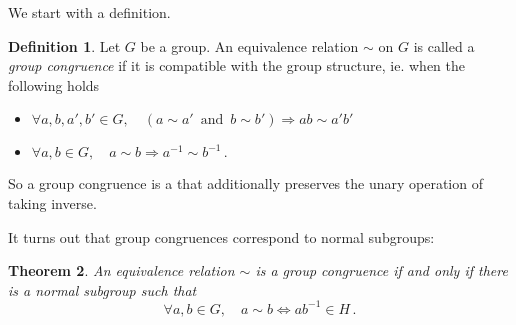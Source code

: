 \documentclass[12pt]{article}
\newtheorem{thm}{Theorem}
\theoremstyle{definition}
\newtheorem{defn}[thm]{Definition}
\theoremstyle{remark}
\numberwithin{equation}{subsection}
\begin{document}
We start with a definition.  

\begin{defn}
  Let $G$ be a group.  An equivalence relation $\sim$ on $G$ is
  called a \emph{group congruence} if it is compatible with the 
  group structure, ie. when the following holds
  \begin{itemize}
  \item $\forall a,b,a',b'\in G,\quad (a\sim a'\,\,\, \text{and}
    \,\,\, b\sim b')  \Rightarrow ab \sim a'b'$
  \item $\forall a,b\in G,\quad a\sim b \Rightarrow a^{-1}\sim b^{-1}\,. $
  \end{itemize}
\end{defn}

So a group congruence is a 
that additionally preserves  the unary operation of taking inverse. 

It turns out that group congruences correspond to normal subgroups:
\begin{thm}
  An equivalence relation $\sim$ is a group congruence 
  if and only if there is a normal subgroup such that 
$$\forall a,b \in G, \quad a\sim b \Longleftrightarrow ab^{-1}\in H\,. $$
\end{thm}
\end{document}
